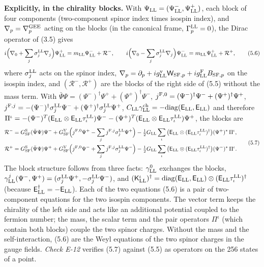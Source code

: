 \documentclass[
  10pt,
]{article}
\begin{document}
\textbf{Explicitly, in the chirality blocks.} With
\(\Psi_{\rm LL}=(\Psi^-_{\rm LL},\Psi^+_{\rm LL})\), each block of four
components (two-component spinor index times isospin index), and
\(\nabla_p=\nabla^{\rm GEE}_p\) acting on the blocks (in the canonical
frame, \(\Gamma^{\rm LL}_p=0\)), the Dirac operator of (3.5) gives
\[i\Big(\nabla_0+\sum_j\sigma^{\rm LL}_j\nabla_j\Big)\Psi^+_{\rm LL}=m_{\rm LL}\Psi^-_{\rm LL}+\mathcal R^-,\qquad i\Big(\nabla_0-\sum_j\sigma^{\rm LL}_j\nabla_j\Big)\Psi^-_{\rm LL}=m_{\rm LL}\Psi^+_{\rm LL}+\mathcal R^+,\tag{5.6}\]
where \(\sigma^{\rm LL}_j\) acts on the spinor index,
\(\nabla_p=\partial_p+ig^{\rm v}_{\rm LL}\mathsf W_{{\rm SF},p}+ig^{\rm F}_{\rm LL}B_{{\rm SF},p}\)
on the isospin index, and \((\mathcal R^-,\mathcal R^+)\) are the blocks
of the right side of (5.5) without the mass term. With
\(\bar\Psi\Psi=(\Psi^-)^\dagger\Psi^++(\Psi^+)^\dagger\Psi^-\),
\(j^{{\rm F},0}=(\Psi^-)^\dagger\Psi^-+(\Psi^+)^\dagger\Psi^+\),
\(j^{{\rm F},j}=-(\Psi^-)^\dagger\sigma^{\rm LL}_j\Psi^-+(\Psi^+)^\dagger\sigma^{\rm LL}_j\Psi^+\),
\(C_{\rm LL}\gamma^{\rm ch}_{\rm LL}=-\mathrm{diag}(\mathsf E_{\rm LL},\mathsf E_{\rm LL})\)
and therefore
\(\Pi^\iota=-(\Psi^-)^T(\mathsf E_{\rm LL}\otimes\mathsf E_{\rm LL}\tau^{\rm LL}_\iota)\Psi^--(\Psi^+)^T(\mathsf E_{\rm LL}\otimes\mathsf E_{\rm LL}\tau^{\rm LL}_\iota)\Psi^+\),
the blocks are
\[\begin{aligned}\mathcal R^-&=G^{\rm S}_{\rm SF}(\bar\Psi\Psi)\Psi^-+G^{\rm V}_{\rm SF}\Big(j^{{\rm F},0}\Psi^+-\sum_jj^{{\rm F},j}\sigma^{\rm LL}_j\Psi^+\Big)-\tfrac12G_{\rm LL}\sum_\iota\big(\mathsf E_{\rm LL}\otimes(\mathsf E_{\rm LL}\tau^{\rm LL}_\iota)^\dagger\big)(\Psi^+)^*\,\Pi^\iota,\\\mathcal R^+&=G^{\rm S}_{\rm SF}(\bar\Psi\Psi)\Psi^++G^{\rm V}_{\rm SF}\Big(j^{{\rm F},0}\Psi^-+\sum_jj^{{\rm F},j}\sigma^{\rm LL}_j\Psi^-\Big)-\tfrac12G_{\rm LL}\sum_\iota\big(\mathsf E_{\rm LL}\otimes(\mathsf E_{\rm LL}\tau^{\rm LL}_\iota)^\dagger\big)(\Psi^-)^*\,\Pi^\iota.\end{aligned}\tag{5.7}\]
The block structure follows from three facts: \(\gamma^0_{\rm LL}\)
exchanges the blocks,
\(\gamma^j_{\rm LL}(\Psi^-,\Psi^+)=(\sigma^{\rm LL}_j\Psi^+,-\sigma^{\rm LL}_j\Psi^-)\),
and
\((\mathsf K^\iota_{\rm LL})^\dagger=\mathrm{diag}(\mathsf E_{\rm LL},\mathsf E_{\rm LL})\otimes(\mathsf E_{\rm LL}\tau^{\rm LL}_\iota)^\dagger\)
(because \(\mathsf E_{\rm LL}^\dagger=-\mathsf E_{\rm LL}\)). Each of
the two equations (5.6) is a pair of two-component equations for the two
isospin components. The vector term keeps the chirality of the left side
and acts like an additional potential coupled to the fermion number; the
mass, the scalar term and the pair operators \(\Pi^\iota\) (which
contain both blocks) couple the two spinor charges. Without the mass and
the self-interaction, (5.6) are the Weyl equations of the two spinor
charges in the gauge fields. \emph{Check E-12} verifies (5.7) against
(5.5) as operators on the 256 states of a point.
\end{document}
